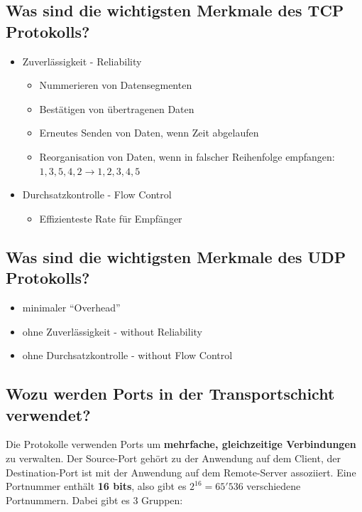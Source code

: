 \subsection*{Was sind die wichtigsten Merkmale des TCP Protokolls?}
\begin{itemize}
    \item Zuverlässigkeit - Reliability
    \begin{itemize}
        \item Nummerieren von Datensegmenten
        \item Bestätigen von übertragenen Daten
        \item Erneutes Senden von Daten, wenn Zeit abgelaufen
        \item Reorganisation von Daten, wenn in falscher Reihenfolge empfangen: $1,3,5,4,2 \rightarrow 1,2,3,4,5$
    \end{itemize}
    \item Durchsatzkontrolle - Flow Control
    \begin{itemize}
        \item Effizienteste Rate für Empfänger
    \end{itemize}
\end{itemize}

\subsection*{Was sind die wichtigsten Merkmale des UDP Protokolls?}
\begin{itemize}
    \item minimaler "`Overhead"'
    \item ohne Zuverlässigkeit - without Reliability
    \item ohne Durchsatzkontrolle - without Flow Control
\end{itemize}

\subsection*{Wozu werden Ports in der Transportschicht verwendet?}\label{sub:Ports}
Die Protokolle verwenden Ports um \textbf{mehrfache, gleichzeitige Verbindungen} zu verwalten. Der Source-Port gehört zu der Anwendung auf dem Client, der Destination-Port ist mit der Anwendung auf dem Remote-Server assoziiert. Eine Portnummer enthält \textbf{16 bits}, also gibt es \textbf{$2^{16}=65'536$} verschiedene Portnummern. Dabei gibt es 3 Gruppen:\\

